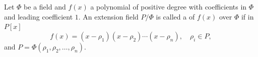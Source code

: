Let $\Phi$ be a field and $f(x)$ a polynomial of positive degree with coefficients in $\Phi$ and leading coefficient $1$. An extension field $P/\Phi$ is called a  of $f(x)$ over $\Phi$ if in $P[x]$
$$f(x) = (x - \rho_1)(x - \rho_2) \cdots (x - \rho_n), \quad \rho_i \in P,$$
and $P = \Phi(\rho_1, \rho_2, \ldots, \rho_n)$.
